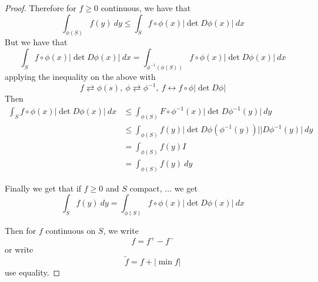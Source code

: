 \documentclass[11pt,openany]{book}
\theoremstyle{plain}
\theoremstyle{definition}
\theoremstyle{remark}
\newcommand{\abs}[1]{\lvert #1 \rvert}
\begin{document}
\begin{proof}
    Therefore for $f \ge 0$ continuous, we have that 
    $$\int_{\phi(S)} f(y) \ dy \le \int_S f \circ \phi(x) \abs{\det D\phi(x)} \ dx$$
    But we have that 
    $$\int_S f \circ \phi(x) \abs{\det D\phi(x)} \ dx = \int_{\phi^{-1} (\phi(S))} f \circ \phi(x) \abs{\det D\phi(x)} \ dx$$
    applying the inequality on the above with 
    $$f \rightleftarrows \phi(s), \ \phi \rightleftarrows \phi^{-1}, \ f \leftrightarrow f \circ \phi \abs{\det D\phi}$$
    Then
    \begin{align*}
        \int_S f \circ \phi(x) \abs{\det D\phi(x)} \ dx &\le \int_{\phi(S)} F \circ \phi^{-1} (x) \abs{\det D\phi^{-1}(y)} \ dy \\
        &\le \int_{\phi(S)} f(y) \abs{\det D\phi(\phi^{-1}(y))} \abs{D\phi^{-1}(y)} \ dy \\ 
        &= \int_{\phi(S)} f(y) I \\
        &= \int_{\phi(S)} f(y) \ dy
    \end{align*}
    
    Finally we get that if $f \ge 0$ and $S$ compact, ... we get 
    $$\int_S f(y) \ dy = \int_{\phi(S)} f \circ \phi(x) \abs{\det D\phi(x)} \ dx$$

    Then for $f$ continuous on $S$, we write 
    $$f = f^+ - f^-$$
    or write 
    $$\tilde{f} = f + \abs{\min f}$$
    use equality. 
\end{proof}
\end{document}
